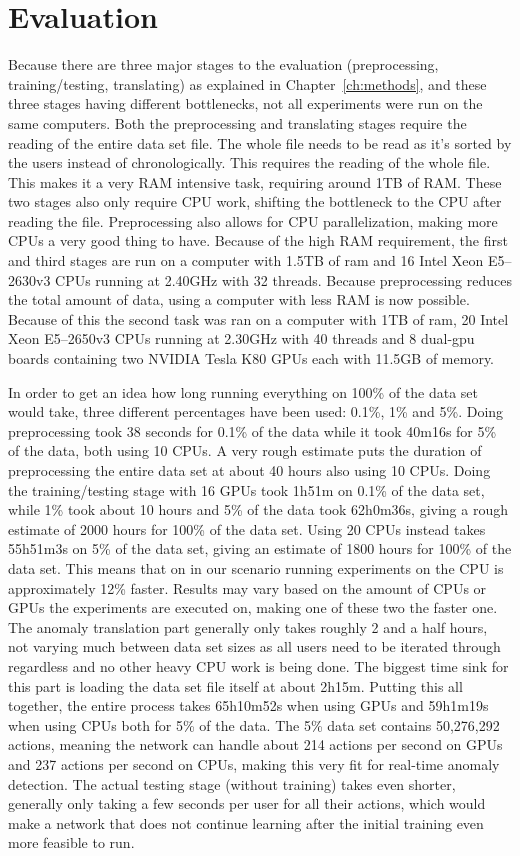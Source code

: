 \chapter{Evaluation}\label{ch:evaluation}

Because there are three major stages to the evaluation (preprocessing, training/testing, translating) as explained in Chapter~\ref{ch:methods}, and these three stages having different bottlenecks, not all experiments were run on the same computers. Both the preprocessing and translating stages require the reading of the entire data set file. The whole file needs to be read as it's sorted by the users instead of chronologically. This requires the reading of the whole file. This makes it a very RAM intensive task, requiring around 1TB of RAM. These two stages also only require CPU work, shifting the bottleneck to the CPU after reading the file. Preprocessing also allows for CPU parallelization, making more CPUs a very good thing to have. Because of the high RAM requirement, the first and third stages are run on a computer with 1.5TB of ram and 16 Intel Xeon E5--2630v3 CPUs running at 2.40GHz with 32 threads. Because preprocessing reduces the total amount of data, using a computer with less RAM is now possible. Because of this the second task was ran on a computer with 1TB of ram, 20 Intel Xeon E5--2650v3 CPUs running at 2.30GHz with 40 threads and 8 dual-gpu boards containing two NVIDIA Tesla K80 GPUs each with 11.5GB of memory. 

In order to get an idea how long running everything on 100\% of the data set would take, three different percentages have been used: 0.1\%, 1\% and 5\%. Doing preprocessing took 38 seconds for 0.1\% of the data while it took 40m16s for 5\% of the data, both using 10 CPUs. A very rough estimate puts the duration of preprocessing the entire data set at about 40 hours also using 10 CPUs. Doing the training/testing stage with 16 GPUs took 1h51m on 0.1\% of the data set, while 1\% took about 10 hours and 5\% of the data took 62h0m36s, giving a rough estimate of 2000 hours for 100\% of the data set. Using 20 CPUs instead takes 55h51m3s on 5\% of the data set, giving an estimate of 1800 hours for 100\% of the data set. This means that on in our scenario running experiments on the CPU is approximately 12\% faster. Results may vary based on the amount of CPUs or GPUs the experiments are executed on, making one of these two the faster one. The anomaly translation part generally only takes roughly 2 and a half hours, not varying much between data set sizes as all users need to be iterated through regardless and no other heavy CPU work is being done. The biggest time sink for this part is loading the data set file itself at about 2h15m. Putting this all together, the entire process takes 65h10m52s when using GPUs and 59h1m19s when using CPUs both for 5\% of the data. The 5\% data set contains 50,276,292 actions, meaning the network can handle about 214 actions per second on GPUs and 237 actions per second on CPUs, making this very fit for real-time anomaly detection. The actual testing stage (without training) takes even shorter, generally only taking a few seconds per user for all their actions, which would make a network that does not continue learning after the initial training even more feasible to run.